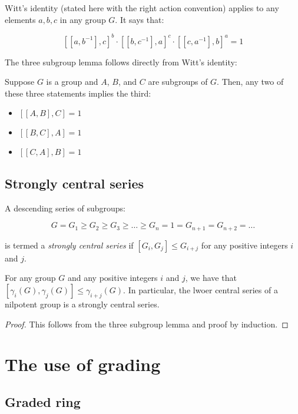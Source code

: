 \documentclass{ucetd}
\begin{document}
Witt's identity (stated here with the right action convention) applies
to any elements $a,b,c$ in any group $G$. It says that:

$$[[a,b^{-1}],c]^b \cdot [[b,c^{-1}],a]^c \cdot [[c,a^{-1}],b]^a  = 1$$

The three subgroup lemma follows directly from Witt's identity:

\begin{lemma}
  Suppose $G$ is a group and $A$, $B$, and $C$ are subgroups of
  $G$. Then, any two of these three statements implies the third:

  \begin{itemize}
  \item $[[A,B],C] = 1$
  \item $[[B,C],A] = 1$
  \item $[[C,A],B] = 1$
  \end{itemize}
\end{lemma}

\subsection{Strongly central series}

A descending series of subgroups:

$$G = G_1 \ge G_2 \ge G_3 \ge \dots \ge G_n = 1 = G_{n+1} = G_{n+2} = \dots$$

is termed a {\em strongly central series} if $[G_i,G_j] \le G_{i+j}$
for any positive integers $i$ and $j$.

\begin{lemma}
  For any group $G$ and any positive integers $i$ and $j$, we have
  that $[\gamma_i(G),\gamma_j(G)] \le \gamma_{i+j}(G)$. In particular,
  the lwoer central series of a nilpotent group is a strongly central series.
\end{lemma}

\begin{proof}
  This follows from the three subgroup lemma and proof by induction.
\end{proof}

\section{The use of grading}

\subsection{Graded ring}
\end{document}
